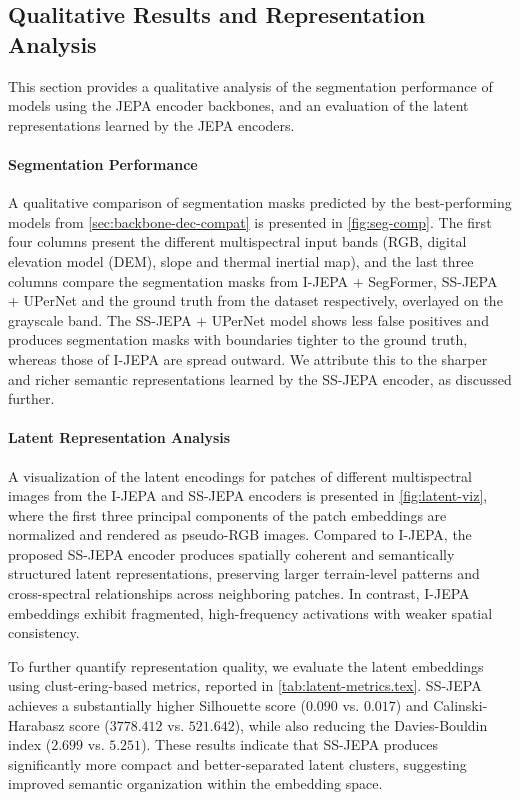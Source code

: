 \subsection{Qualitative Results and Representation Analysis}
\label{sec:qual-eval}

This section provides a qualitative analysis of the segmentation performance of models using the JEPA encoder backbones, and an evaluation of the latent representations learned by the JEPA encoders.

\paragraph{Segmentation Performance}
A qualitative comparison of segmentation masks predicted by the best-performing models from \cref{sec:backbone-dec-compat} is presented in \cref{fig:seg-comp}. The first four columns present the different multispectral input bands (RGB, digital elevation model (DEM), slope and thermal inertial map), and the last three columns compare the segmentation masks from I-JEPA + SegFormer, SS-JEPA + UPerNet and the ground truth from the dataset respectively, overlayed on the grayscale band. The SS-JEPA + UPerNet model shows less false positives and produces segmentation masks with boundaries tighter to the ground truth, whereas those of I-JEPA are spread outward. We attribute this to the sharper and richer semantic representations learned by the SS-JEPA encoder, as discussed further.

\paragraph{Latent Representation Analysis}
A visualization of the latent encodings for patches of different multispectral images from the I-JEPA and SS-JEPA encoders is presented in \cref{fig:latent-viz}, where the first three principal components of the patch embeddings are normalized and rendered as pseudo-RGB images. Compared to I-JEPA, the proposed SS-JEPA encoder produces spatially coherent and semantically structured latent representations, preserving larger terrain-level patterns and cross-spectral relationships across neighboring patches. In contrast, I-JEPA embeddings exhibit fragmented, high-frequency activations with weaker spatial consistency.

To further quantify representation quality, we evaluate the latent embeddings using clust-ering-based metrics, reported in \cref{tab:latent-metrics.tex}. SS-JEPA achieves a substantially higher Silhouette score ($0.090$ vs. $0.017$) and Calinski-Harabasz score ($3778.412$ vs. $521.642$), while also reducing the Davies-Bouldin index ($2.699$ vs. $5.251$). These results indicate that SS-JEPA produces significantly more compact and better-separated latent clusters, suggesting improved semantic organization within the embedding space.

